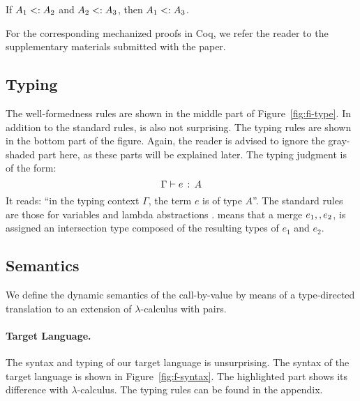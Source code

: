 \begin{lemma} \label{lemma:sub-trans}
  If $ A_1 <: A_2 $ and $ A_2 <: A_3 $,
  then $ A_1 <: A_3 $.
\end{lemma}

For the corresponding mechanized proofs in Coq, we refer the reader to the
supplementary materials submitted with the paper.

\subsection{Typing}

The well-formedness rules are shown in the middle part of
Figure~\ref{fig:fi-type}. In addition to the standard rules,
 is also not surprising. The typing rules are shown in
the bottom part of the figure. Again, the reader is advised to ignore the
gray-shaded part here, as these parts will be explained later. The typing
judgment is of the form: \[ \Gamma \vdash e \ \!:\! \ A \] It reads: ``in the typing
context $\Gamma$, the term $e$ is of type $A$''. The standard rules are those
for variables  and lambda abstractions
.  means that a merge $e_1 ,,
e_2$, is assigned an intersection type composed of the resulting types of $e_1$
and $e_2$.

\subsection{Semantics}

We define the dynamic semantics of the call-by-value \name by means of
a type-directed translation to an extension of $\lambda$-calculus with pairs.


\paragraph{Target Language.}
The syntax and typing of our target language is unsurprising. The syntax of the
target language is shown in Figure~\ref{fig:f-syntax}. The highlighted part
shows its difference with $\lambda$-calculus. The typing rules can be found
in the appendix.


